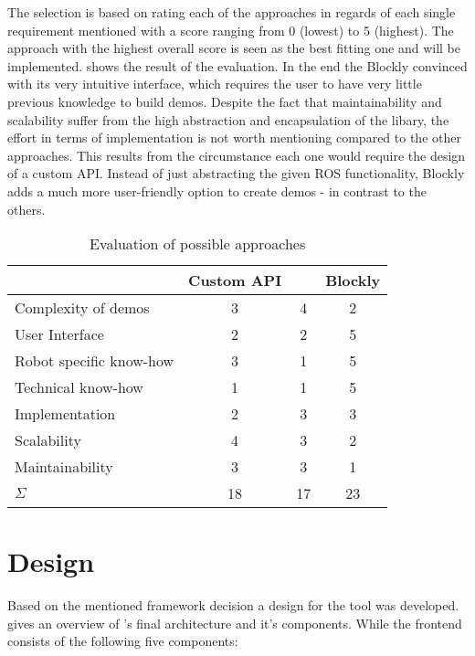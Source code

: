 The selection is based on rating each of the approaches in regards of each single requirement mentioned with a score ranging from 0 (lowest) to 5 (highest). The approach with the highest overall score is seen as the best fitting one and will be implemented.  shows the result of the evaluation. In the end the Blockly convinced with its very intuitive interface, which requires the user to have very little previous knowledge to build demos. Despite the fact that maintainability and scalability suffer from the high abstraction and encapsulation of the libary, the effort in terms of implementation is not worth mentioning compared to the other approaches. This results from the circumstance each one would require the design of a custom API. Instead of just abstracting the given ROS functionality, Blockly adds a much more user-friendly option to create demos - in contrast to the others.

\begin{table}[htbp]
	\centering
	\begin{tabular}{l c c c}
		\toprule
		                        & Custom API & \smach{} & Blockly \\
		\midrule
		Complexity of demos     & 3          & 4        & 2       \\
		User Interface          & 2          & 2        & 5       \\
		Robot specific know-how & 3          & 1        & 5       \\
		Technical know-how      & 1          & 1        & 5       \\
		Implementation          & 2          & 3        & 3       \\
		Scalability             & 4          & 3        & 2       \\
		Maintainability         & 3          & 3        & 1       \\
		\bottomrule
		$\Sigma$                & 18         & 17       & 23      \\
		\bottomrule
	\end{tabular}
	\caption{Evaluation of possible approaches}
	\label{tab:decision}
\end{table}

\section{Design} \label{sec:ArchitectureOverview}
Based on the mentioned framework decision a design for the tool was developed.  gives an overview of \toolname{}'s final architecture and it's components. While the frontend consists of the following five components:

